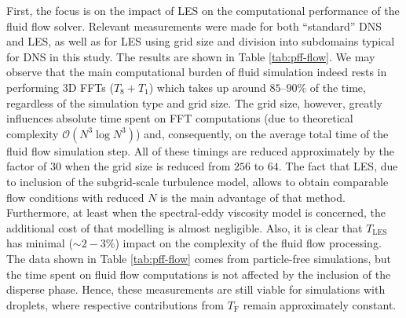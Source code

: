 \documentclass{pracamgren}
\begin{document}
\medskip

First, the focus is on the impact of LES on the computational performance of the fluid flow solver.
Relevant measurements were made for both ``standard'' DNS and LES, as well as for LES using grid size and division into subdomains typical for DNS in this study.
The results are shown in Table \ref{tab:pff-flow}.
We may observe that the main computational burden of fluid simulation indeed rests in performing 3D FFTs ($T_8 + T_1$) which takes up around $85$--$90 \%$ of the time, regardless of the simulation type and grid size.
The grid size, however, greatly influences absolute time spent on FFT computations (due to theoretical complexity $\mathcal{O}(N^3 \log N^3)$) and, consequently, on the average total time of the fluid flow simulation step.
All of these timings are reduced approximately by the factor of $30$ when the grid size is reduced from $256$ to $64$.
The fact that LES, due to inclusion of the subgrid-scale turbulence model, allows to obtain comparable flow conditions with reduced $N$ is the main advantage of that method.
Furthermore, at least when the spectral-eddy viscosity model is concerned, the additional cost of that modelling is almost negligible.
Also, it is clear that $T_{\text{LES}}$ has minimal ($\sim 2-3 \%$) impact on the complexity of the fluid flow processing.
The data shown in Table \ref{tab:pff-flow} comes from particle-free simulations, but the time spent on fluid flow computations is not affected by the inclusion of the disperse phase.
Hence, these measurements are still viable for simulations with droplets, where respective contributions from $T_{\text{F}}$ remain approximately constant. 
\end{document}
